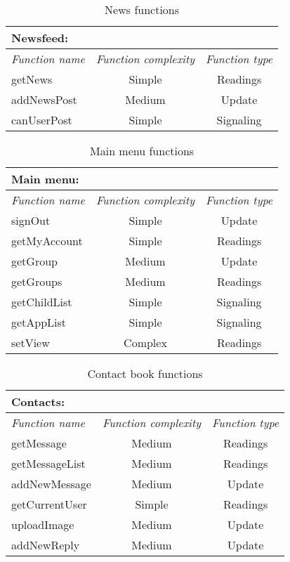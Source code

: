 \begin{table}[!ht]
\centering
\begin{tabular}{ l  c  c }

Newsfeed: & & \\ \hline
\textit{Function name} & \textit{Function complexity} & \textit{Function type} \\ \hline
getNews & Simple & Readings \\ \hline
addNewsPost & Medium & Update \\ \hline
canUserPost & Simple & Signaling \\ \hline

\end{tabular}
\caption{News functions}
\label{tbl:newsfeed}
\end{table}

\begin{table}[!ht]
\centering
\begin{tabular}{ l  c  c }

Main menu: & & \\ \hline
\textit{Function name} & \textit{Function complexity} & \textit{Function type} \\ \hline
signOut & Simple & Update \\ \hline
getMyAccount & Simple & Readings \\ \hline
getGroup & Medium & Update \\ \hline
getGroups & Medium & Readings \\ \hline
getChildList & Simple & Signaling \\ \hline
getAppList & Simple & Signaling \\ \hline
setView & Complex & Readings \\ \hline

\end{tabular}
\caption{Main menu functions}
\label{tbl:mainmenu}
\end{table}

\begin{table}[!ht]
\centering
\begin{tabular}{ l  c  c }

Contacts: & & \\ \hline
\textit{Function name} & \textit{Function complexity} & \textit{Function type} \\ \hline
getMessage & Medium & Readings \\ \hline
getMessageList & Medium & Readings \\ \hline
addNewMessage & Medium & Update \\ \hline
getCurrentUser & Simple & Readings \\ \hline
uploadImage & Medium & Update \\ \hline
addNewReply & Medium & Update \\ \hline

\end{tabular}
\caption{Contact book functions}
\label{tbl:contactbook}
\end{table}

